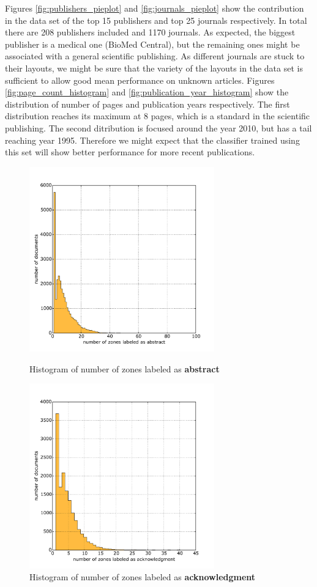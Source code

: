 \quad
Figures \ref{fig:publishers_pieplot} and \ref{fig:journals_pieplot} show the contribution in the data set of the top 15 publishers and top 25 journals respectively. In total there are 208 publishers included and 1170 journals. As expected, the biggest publisher is a medical one (BioMed Central), but the remaining ones might be associated with a general scientific publishing. As different journals are stuck to their layouts, we might be sure that the variety of the layouts in the data set is sufficient to allow good mean performance on unknown articles. 
\quad
Figures \ref{fig:page_count_histogram} and \ref{fig:publication_year_histogram} show the distribution of number of pages and publication years respectively. The first distribution reaches its maximum at 8 pages, which is a standard in the scientific publishing. The second ditribution is focused around the year 2010, but has a tail reaching year 1995. Therefore we might expect that the classifier trained using this set will show better performance for more recent publications.
\begin{figure}[ht]
\centering
\begin{minipage}[t!]{0.48\linewidth}
  \includegraphics[width=8cm]{plots/abstract_histogram}
  \caption{Histogram of number of zones labeled as \textbf{abstract}}
  \label{fig:abstract_histogram}
\end{minipage}
\quad
\begin{minipage}[t!]{0.48\linewidth}
  \includegraphics[width=8cm]{plots/acknowledgment_histogram}
  \caption{Histogram of number of zones labeled as \textbf{acknowledgment}}
  \label{fig:acknowledgment_histogram}
\end{minipage}
\end{figure}

